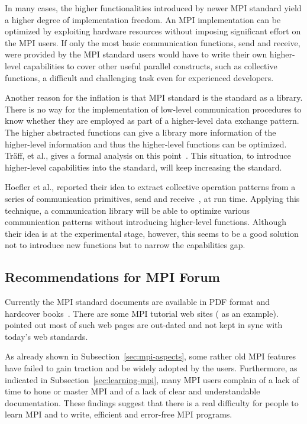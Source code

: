 \documentclass[preprint,5p,times]{elsarticle}
\begin{document}
{In many cases, the higher functionalities introduced by newer MPI standard yield
a higher degree of implementation freedom. An MPI implementation can be optimized by
exploiting hardware resources without imposing significant effort on the MPI
users. If only the most basic communication functions, send and receive, were
provided by the MPI standard users would have to write their own higher-level
capabilities to cover other useful parallel constructs, such as collective
functions, a difficult and challenging task even for experienced developers.

Another reason for the inflation is that MPI standard is the standard
as a library. There is no way for the implementation of low-level communication procedures
to know whether they are employed as part of a higher-level data exchange
pattern. The higher abstracted
functions can give a library more information of the higher-level information and
thus the higher-level functions can be optimized. Tr\"{a}ff, et al., gives
a formal analysis on this point~\cite{5184825}.
This situation, to introduce higher-level capabilities into the standard,
will keep increasing the standard.

Hoefler et al., reported their idea to extract collective operation
patterns from a series of communication primitives, send and
receive~\cite{7842939}, at run time. Applying this technique, a
communication library will be able to optimize various communication
patterns without introducing higher-level functions.
Although their idea is at the experimental
stage, however, this seems to be a good solution not to introduce new
functions but to narrow the capabilities gap.

\subsection{Recommendations for MPI Forum}

Currently the MPI standard documents are available in PDF format and
hardcover books~\cite{mpi-hardcover}. There are some MPI tutorial web
sites (\cite{mpi-tutorial} as an example). \cite{mpi-tutorial-intro}
pointed out most of such web pages are out-dated and not
kept in sync with today's web standards.

As already shown in Subsection~\ref{sec:mpi-aspects}, some rather old MPI
features have failed to gain traction and be widely adopted by the users.
Furthermore, as indicated in Subsection~\ref{sec:learning-mpi}, many MPI users
complain of a lack of time to hone or master MPI and of a lack of clear
and understandable documentation. These findings suggest that there is a real
difficulty for people to learn MPI and to write, efficient and error-free MPI programs.

}
\end{document}
